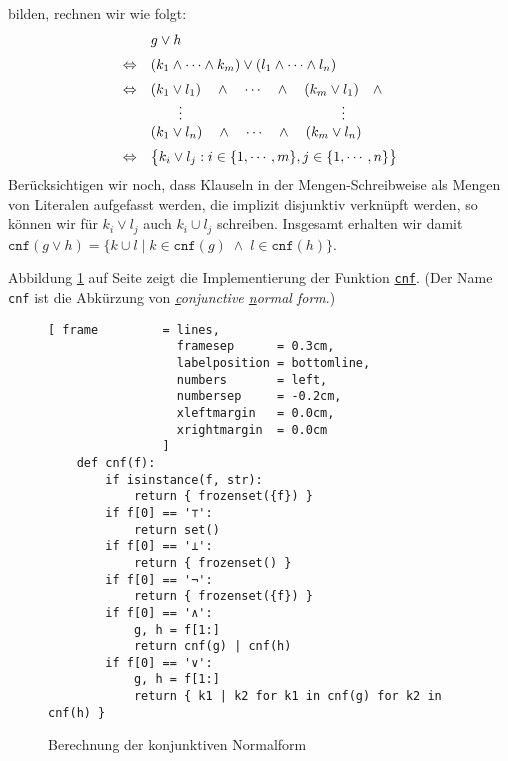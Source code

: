 \begin{enumerate}
      bilden, rechnen wir wie folgt: 
      $$
      \begin{array}[c]{ll}
        & g \vee h  \\[0.2cm]
      \Leftrightarrow & (k_1 \wedge \cdots \wedge k_m) \vee (l_1 \wedge \cdots \wedge l_n) \\[0.2cm]
      \Leftrightarrow & (k_1 \vee l_1) \quad \wedge \quad \cdots \quad \wedge \quad (k_m \vee l_1) \quad \wedge \\ 
                      & \qquad \vdots     \hspace*{4cm} \vdots                \\
                      & (k_1 \vee l_n) \quad \wedge \quad \cdots \quad \wedge \quad (k_m \vee l_n) \\[0.2cm] 
      \Leftrightarrow & \bigl\{ k_i \vee l_j : i \in \{ 1, \cdots, m\}, j \in \{ 1, \cdots, n \} \bigr\} \\ 
      \end{array}
      $$
      Berücksichtigen wir noch, dass Klauseln in der Mengen-Schreibweise als Mengen von
      Literalen aufgefasst werden, die implizit disjunktiv verknüpft werden, so können wir
      für $k_i \vee l_j$ auch $k_i \cup l_j$ schreiben.  
      Insgesamt erhalten wir damit 
      \\[0.2cm]
      \hspace*{1.3cm} 
      $\texttt{cnf}(g \vee h) = \bigl\{ k \cup l \mid k \in \texttt{cnf}(g) \;\wedge\; l \in \texttt{cnf}(h) \bigr\}$.
\end{enumerate}
Abbildung \ref{fig:cnf} auf Seite \pageref{fig:cnf} zeigt die Implementierung der Funktion
\href{https://github.com/karlstroetmann/Logik/blob/master/Python/CNF.ipynb}{\texttt{cnf}}.
(Der Name \texttt{cnf} ist die Abkürzung von \emph{\underline{c}onjunctive \underline{n}ormal \underline{f}orm}.)

\begin{figure}[!ht]
  \centering
\begin{Verbatim}[ frame         = lines, 
                  framesep      = 0.3cm, 
                  labelposition = bottomline,
                  numbers       = left,
                  numbersep     = -0.2cm,
                  xleftmargin   = 0.0cm,
                  xrightmargin  = 0.0cm
                ]
    def cnf(f):
        if isinstance(f, str): 
            return { frozenset({f}) }
        if f[0] == '⊤':
            return set()
        if f[0] == '⊥':
            return { frozenset() }
        if f[0] == '¬':
            return { frozenset({f}) }
        if f[0] == '∧':
            g, h = f[1:]
            return cnf(g) | cnf(h)
        if f[0] == '∨':
            g, h = f[1:]
            return { k1 | k2 for k1 in cnf(g) for k2 in cnf(h) }
\end{Verbatim}
\vspace*{-0.3cm}
  \caption{Berechnung der konjunktiven Normalform}
  \label{fig:cnf}
\end{figure}

